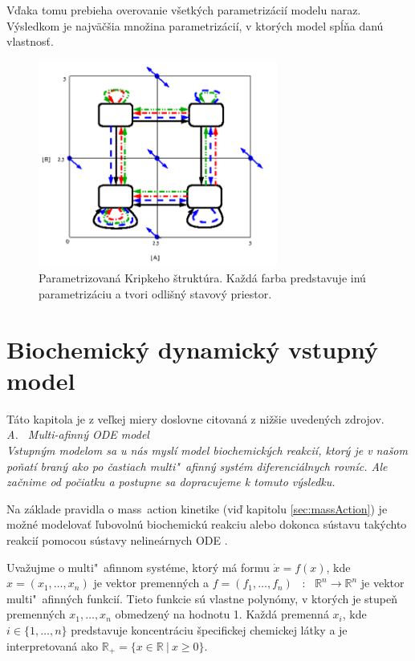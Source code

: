 \documentclass[11pt,final,oneside]{fithesis}
\begin{document}
V\v daka tomu prebieha overovanie v\v setk\'ych parametriz\'aci\'i modelu naraz. V\'ysledkom je najv\"a\v c\v sia mno\v zina parametriz\'aci\'i, v ktor\'ych
model sp\'l\v na dan\'u vlastnos\v t. \cite{TCBB-2010}
\begin{figure}
\centering
\includegraphics[width=0.7\textwidth]{paramKripke.pdf}
\caption{Parametrizovan\'a Kripkeho \v strukt\'ura. Ka\v zd\'a farba predstavuje in\'u parametriz\'aciu a tvori odli\v sn\'y stavov\'y priestor. 
\cite{TCBB-2010}}
\label{fig:kripke}
\end{figure}

\chapter{Biochemick\'y dynamick\'y vstupn\'y model}
\label{sec:model}
T\'ato kapitola je z ve\v lkej miery doslovne citovan\'a z ni\v z\v sie uveden\'ych zdrojov.
\\

\noindent
\it A. \ Multi-afinn\'y ODE model\rm
\\

Vstupn\'ym modelom sa u n\'as mysl\'i model biochemick\'ych reakci\'i, ktor\'y je v na\v som po\v nat\'i bran\'y ako po \v castiach 
multi"~afinn\'y syst\'em diferenci\'alnych rovn\'ic. Ale za\v cnime od po\v ciatku a postupne sa dopracujeme k tomuto v\'ysledku.

Na z\'aklade pravidla o mass~action kinetike (vi\v d kapitolu \ref{sec:massAction}) je mo\v zn\'e modelova\v t \v lubovoln\'u biochemick\'u reakciu alebo dokonca 
s\'ustavu tak\'ych\-to reakci\'i pomocou s\'ustavy neline\'arnych ODE \cite{ODE}.

Uva\v zujme o multi"~afinnom syst\'eme, ktor\'y m\'a formu $\dot{x} = f(x)$, kde $x = (x_1,\dots{},x_n)$ je vektor premenn\'ych a $f = (f_1,\dots{},f_n)$ \ : \ 
$\mathbb{R}^n \rightarrow \mathbb{R}^n$ je vektor multi"~afin\-n\'ych funkci\'i. Tieto funkcie s\'u vlastne polyn\'omy, v ktor\'ych je stupe\v n premenn\'ych 
$x_1,\dots{},x_n$ obmedzen\'y na hodnotu 1. Ka\v zd\'a premenn\'a $x_i$, kde $i \in \{1,\dots{},n\}$ predstavuje koncentr\'aciu \v specifickej chemickej 
l\'atky a je interpretovan\'a ako {$\mathbb{R}_+ = \lbrace{}  x \in \mathbb{R}\ |\ {}x \geq 0  \rbrace$}.
\end{document}
